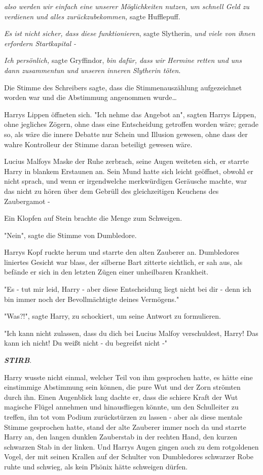 {\emph{also werden wir einfach eine unserer Möglichkeiten nutzen, um schnell Geld zu verdienen und alles zurückzubekommen,} sagte Hufflepuff.

\emph{Es ist nicht sicher, dass diese funktionieren}, sagte Slytherin, \emph{und viele von ihnen erfordern Startkapital -}

\emph{Ich persönlich,} sagte Gryffindor, \emph{bin dafür, dass wir Hermine retten und uns dann zusammentun und unseren inneren Slytherin töten}.

Die Stimme des Schreibers sagte, dass die Stimmenauszählung aufgezeichnet worden war und die Abstimmung angenommen wurde…

Harrys Lippen öffneten sich. "Ich nehme das Angebot an", sagten Harrys Lippen, ohne jegliches Zögern, ohne dass eine Entscheidung getroffen worden wäre; gerade so, als wäre die innere Debatte nur Schein und Illusion gewesen, ohne dass der wahre Kontrolleur der Stimme daran beteiligt gewesen wäre.

Lucius Malfoys Maske der Ruhe zerbrach, seine Augen weiteten sich, er starrte Harry in blankem Erstaunen an. Sein Mund hatte sich leicht geöffnet, obwohl er nicht sprach, und wenn er irgendwelche merkwürdigen Geräusche machte, war das nicht zu hören über dem Gebrüll des gleichzeitigen Keuchens des Zaubergamot -

Ein Klopfen auf Stein brachte die Menge zum Schweigen.

"Nein", sagte die Stimme von Dumbledore.

Harrys Kopf ruckte herum und starrte den alten Zauberer an. Dumbledores liniertes Gesicht war blass, der silberne Bart zitterte sichtlich, er sah aus, als befände er sich in den letzten Zügen einer unheilbaren Krankheit.

"Es - tut mir leid, Harry - aber diese Entscheidung liegt nicht bei dir - denn ich bin immer noch der Bevollmächtigte deines Vermögens."

"Was?!", sagte Harry, zu schockiert, um seine Antwort zu formulieren.

"Ich kann nicht zulassen, dass du dich bei Lucius Malfoy verschuldest, Harry! Das kann ich nicht! Du weißt nicht - du begreifst nicht -"

\textbf{\emph{STIRB}}.

Harry wusste nicht einmal, welcher Teil von ihm gesprochen hatte, es hätte eine einstimmige Abstimmung sein können, die pure Wut und der Zorn strömten durch ihn. Einen Augenblick lang dachte er, dass die schiere Kraft der Wut magische Flügel annehmen und hinausfliegen könnte, um den Schulleiter zu treffen, ihn tot vom Podium zurückstürzen zu lassen - aber als diese mentale Stimme gesprochen hatte, stand der alte Zauberer immer noch da und starrte Harry an, den langen dunklen Zauberstab in der rechten Hand, den kurzen schwarzen Stab in der linken. Und Harrys Augen gingen auch zu dem rotgoldenen Vogel, der mit seinen Krallen auf der Schulter von Dumbledores schwarzer Robe ruhte und schwieg, als kein Phönix hätte schweigen dürfen.

}
